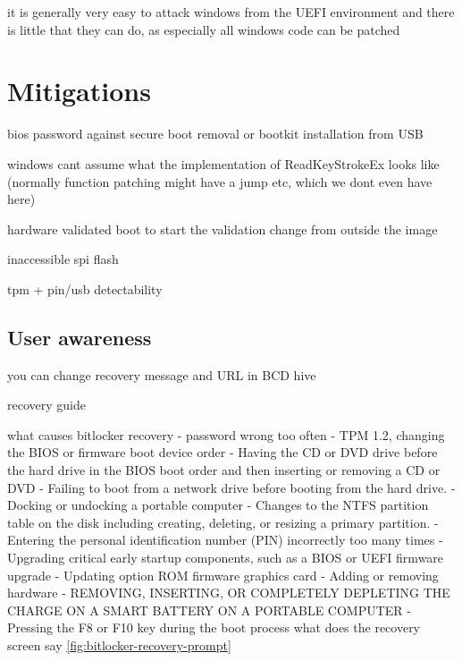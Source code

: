 it is generally very easy to attack windows from the \ac{UEFI} environment and there is little that they can do, as especially all windows code can be patched


\section{Mitigations}

bios password against secure boot removal or bootkit installation from USB

windows cant assume what the implementation of ReadKeyStrokeEx looks like (normally function patching might have a jump etc, which we dont even have here)

hardware validated boot to start the validation change from outside the image

inaccessible spi flash

tpm + pin/usb detectability

\subsection{User awareness}

you can change recovery message and URL in BCD hive



recovery guide

what causes bitlocker recovery
- password wrong too often
- TPM 1.2, changing the BIOS or firmware boot device order
- Having the CD or DVD drive before the hard drive in the BIOS boot order and then inserting or removing a CD or DVD
- Failing to boot from a network drive before booting from the hard drive.
- Docking or undocking a portable computer
- Changes to the NTFS partition table on the disk including creating, deleting, or resizing a primary partition.
- Entering the personal identification number (PIN) incorrectly too many times
- Upgrading critical early startup components, such as a BIOS or UEFI firmware upgrade
- Updating option ROM firmware graphics card
- Adding or removing hardware
- REMOVING, INSERTING, OR COMPLETELY DEPLETING THE CHARGE ON A SMART BATTERY ON A PORTABLE COMPUTER
- Pressing the F8 or F10 key during the boot process
what does the recovery screen say \autoref{fig:bitlocker-recovery-prompt}

